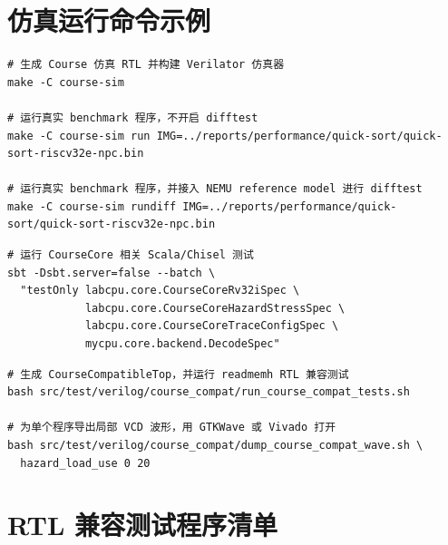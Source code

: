 \documentclass[UTF8,a4paper,12pt]{ctexrep}
\begin{document}
\chapter{仿真运行命令示例}

\begin{lstlisting}[language={}]
# 生成 Course 仿真 RTL 并构建 Verilator 仿真器
make -C course-sim

# 运行真实 benchmark 程序，不开启 difftest
make -C course-sim run IMG=../reports/performance/quick-sort/quick-sort-riscv32e-npc.bin

# 运行真实 benchmark 程序，并接入 NEMU reference model 进行 difftest
make -C course-sim rundiff IMG=../reports/performance/quick-sort/quick-sort-riscv32e-npc.bin
\end{lstlisting}

\begin{lstlisting}[language={}]
# 运行 CourseCore 相关 Scala/Chisel 测试
sbt -Dsbt.server=false --batch \
  "testOnly labcpu.core.CourseCoreRv32iSpec \
            labcpu.core.CourseCoreHazardStressSpec \
            labcpu.core.CourseCoreTraceConfigSpec \
            mycpu.core.backend.DecodeSpec"
\end{lstlisting}

\begin{lstlisting}[language={}]
# 生成 CourseCompatibleTop，并运行 readmemh RTL 兼容测试
bash src/test/verilog/course_compat/run_course_compat_tests.sh

# 为单个程序导出局部 VCD 波形，用 GTKWave 或 Vivado 打开
bash src/test/verilog/course_compat/dump_course_compat_wave.sh \
  hazard_load_use 0 20
\end{lstlisting}

\chapter{RTL 兼容测试程序清单}
\end{document}
